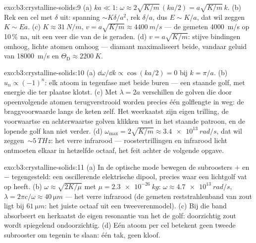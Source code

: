 \begin{solution}{exo:b3:crystalline-solids:9}
(a) $ka \ll 1$: $\omega \approx 2\sqrt{K/m}\,(ka/2) =
a\sqrt{K/m}\,k$. (b) Rek een cel met $\delta$ uit: spanning $\sim
K\delta/a^2$, rek $\delta/a$, dus $E \sim K/a$, dat wil zeggen\ $K \sim
Ea$. (c) $K \approx \qty{31}{N/m}$, $v = a\sqrt{K/m} \approx
\qty{4400}{m/s}$ --- de gemeten \qty{4000}{m/s} op 10\,\% na,
uit een veer die van de  is geraden. (d) $v = a\sqrt{K/m}$:
stijve bindingen omhoog, lichte atomen omhoog --- diamant maximaliseert beide, vandaar
geluid van \qty{18000}{m/s} en $\Theta_{\text{D}} \approx
\qty{2200}{K}$.
\end{solution}

\begin{solution}{exo:b3:crystalline-solids:10}
(a) $\dd\omega/\dd k \propto \cos(ka/2) = 0$ bij $k = \pi/a$. (b)
$u_n \propto (-1)^n$: elk atoom in tegenfase met beide
buren --- een staande golf, met energie die ter plaatse klotst. (c)
Met $\lambda = 2a$ verschillen de golven die door opeenvolgende atomen
terugverstrooid worden precies één golflengte in weg: de braggvoorwaarde
langs de keten zelf. Het  weerkaatst zijn eigen trilling,
de voorwaartse en achterwaartse golven klikken vast in het staande patroon, en
de lopende golf kan niet verder. (d) $\omega_{\text{max}} = 2\sqrt{K/m} \approx
\qty{3.4e13}{rad/s}$, dat wil zeggen\ $\sim\qty{5}{THz}$: het verre infrarood
--- roostertrillingen en infrarood licht ontmoeten elkaar in hetzelfde octaaf,
het feit achter de volgende opgave.
\end{solution}

\begin{solution}{exo:b3:crystalline-solids:11}
(a) In de optische mode bewegen de subroosters $+$ en $-$ tegengesteld:
een oscillerende elektrische dipool, precies waar een lichtgolf
vat op heeft. (b) $\omega \approx \sqrt{2K/\mu}$ met $\mu =
\qty{2.3e-26}{kg}$: $\omega \approx \qty{4.7e13}{rad/s}$,
$\lambda = 2\pi c/\omega \approx \qty{40}{\micro m}$ --- het verre
infrarood (de gemeten reststrahlenband van zout ligt bij
$\qty{61}{\micro m}$: het juiste octaaf uit een tweeverenmodel). (c)
Bij die band absorbeert en herkaatst de eigen resonantie van het 
de golf: doorzichtig zout wordt spiegelend ondoorzichtig. (d) Eén atoom per
cel betekent geen tweede subrooster om tegenin te slaan: één tak,
geen kloof.
\end{solution}

